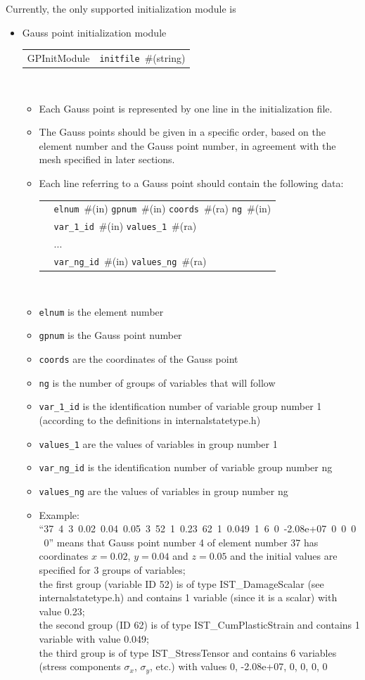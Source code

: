 \documentclass[a4paper]{article}
\makeatletter
\newcommand{\param}[1]{\texttt{#1}} %
\newcommand{\field}[2]{\param{#1}~\#{\tiny(#2)}} %
\newenvironment{record}[1][]{\begin{tabular}{|ll}}{\end{tabular}\\}
\newcommand{\recentry}[2]{{#1}&{#2}\\}
\newcounter{rcc}
\newenvironment{record}[1][\textwidth]{\setcounter{rcc}{0}\begin{tabular*}{#1}{|ll@{\extracolsep{\fill}}r}}{\end{tabular*}\\}
\newcommand{\recentry}[2]{\ifthenelse{\value{rcc}>0}{&$\backslash$ \\}{\setcounter{rcc}{1}}{#1}&{#2}}
\makeatother
\begin{document}
Currently, the only supported initialization module is
\begin{itemize}
\item Gauss point initialization module

\begin{record}[0.9\textwidth]
  \recentry{GPInitModule}{\field{initfile}{string}}  \end{record}
\begin{itemize}
\item
Each Gauss point is represented by one line in the initialization file.
\item
The Gauss points should be given in a specific order, based on the element number and the Gauss point number, in agreement with the mesh specified in later sections.
\item
Each line referring to a Gauss point should contain the following data:

\begin{record}
  \recentry{}{\field{elnum}{in} \field{gpnum}{in} \field{coords}{ra} \field{ng}{in}}
  \recentry{}{\field{var\_1\_id}{in} \field{values\_1}{ra}}
  \recentry{}{ ...}
  \recentry{}{\field{var\_ng\_id}{in} \field{values\_ng}{ra}}
\end{record}
   \item \param{elnum} is the element number
   \item \param{gpnum} is the Gauss point number
   \item \param{coords} are the coordinates of the Gauss point
   \item \param{ng} is the number of groups of variables that will follow
   \item \param{var\_1\_id} is the identification number of variable group number 1 (according to the definitions in internalstatetype.h)
   \item \param{values\_1} are the values of variables in group number 1
   \item \param{var\_ng\_id} is the identification number of variable group number ng
   \item \param{values\_ng} are the values of variables in group number ng
\item Example:\\ \mbox{``37 4 3 0.02 0.04 0.05 3 52 1 0.23 62 1 0.049 1 6 0 -2.08e+07 0 0 0 0''} means that Gauss point number 4 of element number 37 has coordinates $x=0.02$, $y=0.04$ and $z=0.05$ and the initial values are specified for 3 groups of variables;\\ 
the first group (variable ID 52) is of type IST\_DamageScalar (see internalstatetype.h) and contains 1 variable (since it is a scalar) with value 0.23;\\
 the second group (ID 62) is of type IST\_CumPlasticStrain
and contains 1 variable with value 0.049;\\
 the third group is of type IST\_StressTensor
and contains 6 variables (stress components $\sigma_x$, $\sigma_y$, etc.) with values
0, -2.08e+07, 0, 0, 0, 0
\end{itemize}
\end{itemize}
\end{document}
